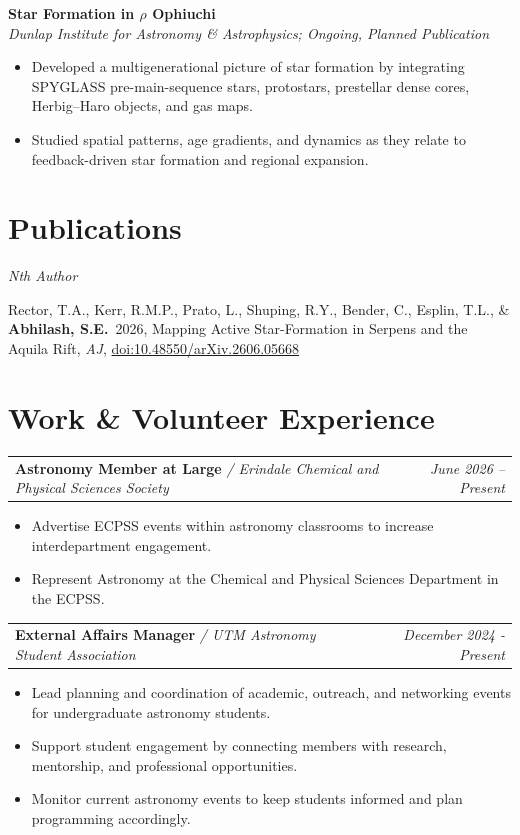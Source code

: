 \documentclass[11pt, letterpaper]{article}
\makeatletter
\newcommand{\cventry}[4]{%
  \noindent
  \begin{tabular*}{\textwidth}{@{}l@{\extracolsep{\fill}}r@{}}
    \textbf{#1} \textit{#2} & \textit{\small #4}
  \end{tabular*}%
  \par\vspace{1pt}%
}
\makeatother
\begin{document}
\vspace{4pt}
\noindent\textbf{Star Formation in $\rho$ Ophiuchi}\\
\textit{Dunlap Institute for Astronomy \& Astrophysics; Ongoing, Planned Publication}
\begin{itemize}
  \item Developed a multigenerational picture of star formation by integrating SPYGLASS pre-main-sequence stars, protostars, prestellar dense cores, Herbig–Haro objects, and gas maps.
  \item Studied spatial patterns, age gradients, and dynamics as they relate to feedback-driven star formation and regional expansion.
\end{itemize}

\section{Publications}

\noindent\textit{Nth Author}
\vspace{4pt}

\begin{enumerate}[leftmargin=2em, label={[\arabic*]}, itemsep=4pt]
  \item Rector, T.A., Kerr, R.M.P., Prato, L., Shuping, R.Y., Bender, C., Esplin, T.L., \& \textbf{Abhilash, S.E.}\ 2026, Mapping Active Star-Formation in Serpens and the Aquila Rift, \textit{AJ}, \href{https://doi.org/10.48550/arXiv.2606.05668}{doi:10.48550/arXiv.2606.05668}
\end{enumerate}

\section{Work \& Volunteer Experience}

\cventry{Astronomy Member at Large}{/ Erindale Chemical and Physical Sciences Society}{}{June 2026 -- Present}
\begin{itemize}
  \item Advertise ECPSS events within astronomy classrooms to increase interdepartment engagement.
  \item Represent Astronomy at the Chemical and Physical Sciences Department in the ECPSS.
\end{itemize}

\vspace{4pt}
\cventry{External Affairs Manager}{/ UTM Astronomy Student Association}{}{December 2024 - Present}
\begin{itemize}
  \item Lead planning and coordination of academic, outreach, and networking events for undergraduate astronomy students.
  \item Support student engagement by connecting members with research, mentorship, and professional opportunities.
  \item Monitor current astronomy events to keep students informed and plan programming accordingly.
\end{itemize}
\end{document}
